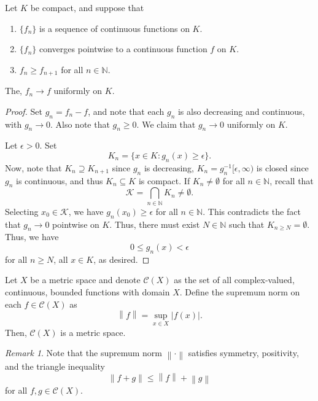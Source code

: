 \documentclass[11pt]{article}
\def\N{\mathbb{N}}
\newcommand\norm[1]{\left\lVert#1\right\rVert}
\theoremstyle{definition}
\theoremstyle{remark}
\newtheorem*{remark}{Remark}
\numberwithin{equation}{module}
\begin{document}
    \begin{theorem}
        Let $K$ be compact, and suppose that 
        \begin{enumerate}
            \itemsep0em
            \item $\{f_n\}$ is a sequence of continuous functions on $K$.
            \item $\{f_n\}$ converges pointwise to a continuous function $f$ on $K$.
            \item $f_n \geq f_{n + 1}$ for all $n \in \N$.
        \end{enumerate}
        The, $f_n \to f$ uniformly on $K$.
    \end{theorem}
    \begin{proof}
        Set $g_n = f_n - f$, and note that each $g_n$ is also decreasing and
        continuous, with $g_n \to 0$. 
        Also note that $g_n \geq 0$.
        We claim that $g_n \to 0$ uniformly on $K$.

        Let $\epsilon > 0$. Set \[
            K_n = \{x \in K\colon g_n(x) \geq \epsilon\}.
        \] Now, note that $K_n \supseteq K_{n + 1}$ since $g_n$ is decreasing, $K_n
        = g_n^{-1}[\epsilon, \infty)$ is closed since $g_n$ is continuous, and thus
        $K_n \subseteq K$ is compact.  If $K_n \neq \emptyset$ for all $n \in \N$,
        recall that \[
            \mathcal{K} = \bigcap_{n \in \N} K_n \neq \emptyset.
        \] Selecting $x_0 \in \mathcal{K}$, we have $g_n(x_0) \geq \epsilon$ for all
        $n \in \N$. This contradicts the fact that $g_n \to 0$ pointwise on $K$.
        Thus, there must exist $N \in \N$ such that $K_{n \geq N} = \emptyset$.
        Thus, we have \[
            0 \leq g_n(x) < \epsilon
        \] for all $n \geq N$, all $x \in K$, as desired.
    \end{proof}

    \begin{definition}
        Let $X$ be a metric space and denote $\mathscr{C}(X)$ as the set of all
        complex-valued, continuous, bounded functions with domain $X$.
        Define the supremum norm on each $f \in \mathscr{C}(X)$ as \[
            \norm{f} = \sup_{x \in X} |f(x)|.
        \] Then, $\mathscr{C}(X)$ is a metric space.
        \begin{remark}
            Note that the supremum norm $\norm{\cdot}$ satisfies symmetry,
            positivity, and the triangle inequality \[
                \norm{f + g} \leq \norm{f} + \norm{g}
            \] for all $f, g \in \mathscr{C}(X)$.
        \end{remark}
    \end{definition}
\end{document}

